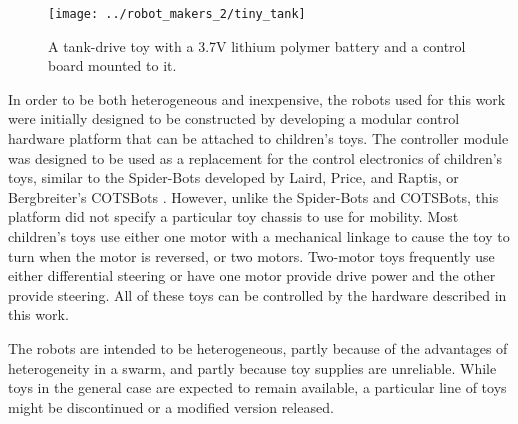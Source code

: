 \begin{figure}
	\centering
	\texttt{[image: ../robot\_makers\_2/tiny\_tank]}
	\caption{A tank-drive toy with a 3.7V lithium polymer battery and a control board mounted to it.}
\end{figure}

In order to be both heterogeneous and inexpensive, the robots used for this work were initially designed to be constructed by developing a modular control hardware platform that can be attached to children's toys. 
The controller module was designed to be used as a replacement for the control electronics of children's toys, similar to the Spider-Bots developed by Laird, Price, and Raptis, or Bergbreiter's COTSBots \citep{lairdspider, bergbreiter2003cotsbots}.
However, unlike the Spider-Bots and COTSBots, this platform did not specify a particular toy chassis to use for mobility. 
Most children's toys use either one motor with a mechanical linkage to cause the toy to turn when the motor is reversed, or two motors.
Two-motor toys frequently use either differential steering or have one motor provide drive power and the other provide steering. 
All of these toys can be controlled by the hardware described in this work. 

The robots are intended to be heterogeneous, partly because of the advantages of heterogeneity in a swarm, and partly because toy supplies are unreliable.
While toys in the general case are expected to remain available, a particular line of toys might be discontinued or a modified version released. 

